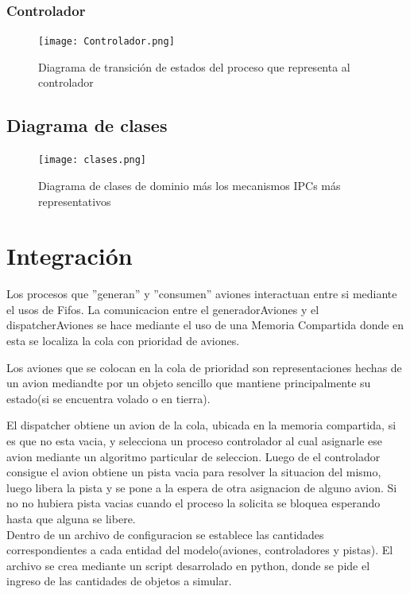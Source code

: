 \documentclass[a4paper,12pt,titlepage]{article}
\begin{document}
\subsubsection{Controlador}
\begin{figure}[h!]
\centering
\texttt{[image: Controlador.png]}
\caption{Diagrama de transición de estados del proceso que representa al controlador}
\label{fig:estados_controlador}
\end{figure}
\newpage
\subsection{Diagrama de clases}
\begin{figure}[h!]
\centering
\texttt{[image: clases.png]}
\caption{Diagrama de clases de dominio más los mecanismos IPCs más representativos}
\label{fig:clases}
\end{figure}
\newpage
\section{Integración}


Los procesos que ''generan'' y ''consumen'' aviones interactuan entre si mediante el usos de Fifos. La comunicacion entre el generadorAviones y el dispatcherAviones se hace mediante el uso de una Memoria Compartida donde en esta se localiza la cola con prioridad de aviones. 

Los aviones que se colocan en la cola de prioridad son representaciones hechas de un avion mediandte por un objeto sencillo que mantiene principalmente su estado(si se encuentra volado o en tierra).

El dispatcher obtiene un avion de la cola, ubicada en la memoria compartida, si es que no esta vacia, y selecciona un proceso controlador al cual asignarle ese avion mediante un algoritmo particular de seleccion.
Luego de el controlador consigue el avion obtiene un pista vacia para resolver la situacion del mismo, luego libera la pista y se pone a la espera de otra asignacion de alguno avion. Si no no hubiera pista vacias cuando el proceso la solicita se bloquea esperando hasta que alguna se libere.\\


Dentro de un archivo de configuracion se establece las cantidades correspondientes a cada entidad del modelo(aviones, controladores y pistas). El archivo se crea mediante un script desarrolado en python, donde se pide el ingreso de las cantidades de objetos a simular.
\end{document}

